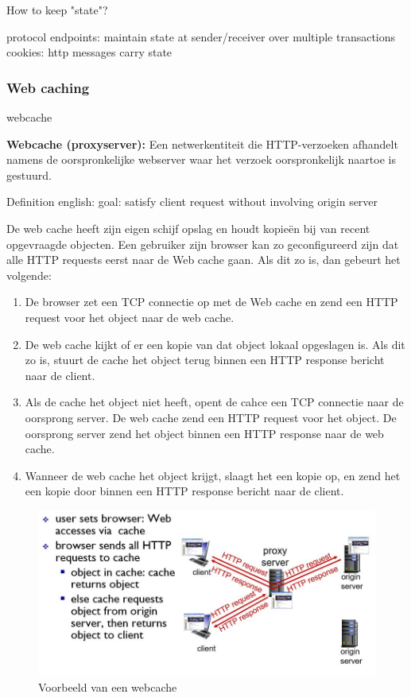 \noindent How to keep "state"?

\bi
\itf protocol endpoints: maintain state at sender/receiver over multiple transactions
\itf cookies: http messages carry state
\ei



\subsubsection{Web caching}

\gls{webcache} 

\noindent \textbf{Webcache (proxyserver):} Een netwerkentiteit die HTTP-verzoeken afhandelt namens de oorspronkelijke webserver waar het verzoek oorspronkelijk naartoe is gestuurd.

\noindent Definition english: goal: satisfy client request without involving origin server

\noindent De web cache heeft zijn eigen schijf opslag en houdt kopieën bij van recent opgevraagde objecten. Een gebruiker zijn browser kan zo geconfigureerd zijn dat alle HTTP requests eerst naar de Web cache gaan. Als dit zo is, dan gebeurt het volgende:
\begin{enumerate}
    \item De browser zet een TCP connectie op met de Web cache en zend een HTTP request voor het object naar de web cache.
\item De web cache kijkt of er een kopie van dat object lokaal opgeslagen is. Als dit zo is, stuurt de cache het object terug binnen een HTTP response bericht naar de client.
\item Als de cache het object niet heeft, opent de cahce een TCP connectie naar de oorsprong server. De web cache zend een HTTP request voor het object. De oorsprong server zend het object binnen een HTTP response naar de web cache.
\item Wanneer de web cache het object krijgt, slaagt het een kopie op, en zend het een kopie door binnen een HTTP response bericht naar de client.
\end{enumerate}

\begin{figure}[h]
\centering
\includegraphics[width=4.5in]{./img/imghfdst2/webcache.jpg}
\caption{Voorbeeld van een webcache }
\label{fig:webcache}
\end{figure}

